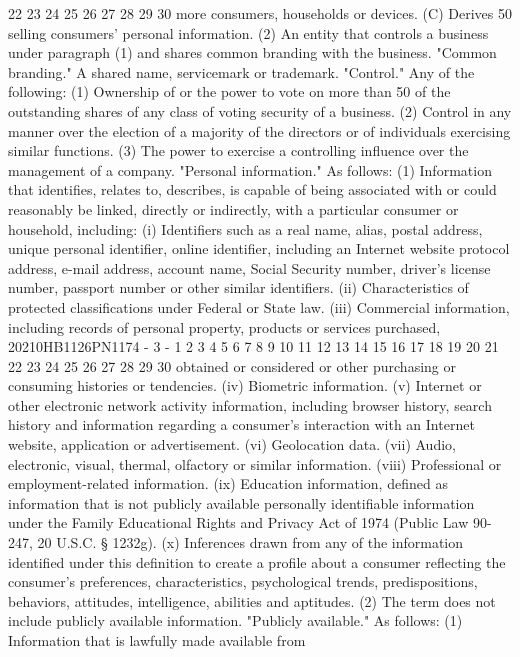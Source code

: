 22
23
24
25
26
27
28
29
30
more consumers, households or devices.
(C) Derives 50%
selling consumers' personal information.
(2) An entity that controls a business under paragraph
(1) and shares common branding with the business.
"Common branding." A shared name, servicemark or trademark.
"Control." Any of the following:
(1) Ownership of or the power to vote on more than 50%
of the outstanding shares of any class of voting security of
a business.
(2) Control in any manner over the election of a
majority of the directors or of individuals exercising
similar functions.
(3) The power to exercise a controlling influence over
the management of a company.
"Personal information." As follows:
(1) Information that identifies, relates to, describes,
is capable of being associated with or could reasonably be
linked, directly or indirectly, with a particular consumer or
household, including:
(i) Identifiers such as a real name, alias, postal
address, unique personal identifier, online identifier,
including an Internet website protocol address, e-mail
address, account name, Social Security number, driver's
license number, passport number or other similar
identifiers.
(ii) Characteristics of protected classifications
under Federal or State law.
(iii) Commercial information, including records of
personal property, products or services purchased,
20210HB1126PN1174 - 3 -
1
2
3
4
5
6
7
8
9
10
11
12
13
14
15
16
17
18
19
20
21
22
23
24
25
26
27
28
29
30
obtained or considered or other purchasing or consuming
histories or tendencies.
(iv) Biometric information.
(v) Internet or other electronic network activity
information, including browser history, search history
and information regarding a consumer's interaction with
an Internet website, application or advertisement.
(vi) Geolocation data.
(vii) Audio, electronic, visual, thermal, olfactory
or similar information.
(viii) Professional or employment-related
information.
(ix) Education information, defined as information
that is not publicly available personally identifiable
information under the Family Educational Rights and
Privacy Act of 1974 (Public Law 90-247, 20 U.S.C. §
1232g).
(x) Inferences drawn from any of the information
identified under this definition to create a profile
about a consumer reflecting the consumer's preferences,
characteristics, psychological trends, predispositions,
behaviors, attitudes, intelligence, abilities and
aptitudes.
(2) The term does not include publicly available
information.
"Publicly available." As follows:
(1) Information that is lawfully made available from
